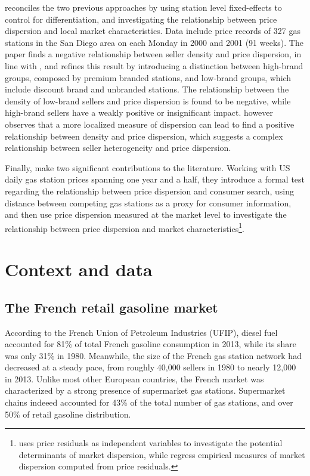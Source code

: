 \documentclass[english]{article}
\begin{document}
\cite{LEW08} reconciles the two previous approaches by using station level fixed-effects to control for differentiation, and investigating the relationship between price dispersion and local market characteristics. Data include price records of 327 gas stations in the San Diego area on each Monday in 2000 and 2001 (91 weeks). The paper finds a negative relationship between seller density and price dispersion, in line with \cite{BAR04}, and refines this result by introducing a distinction between high-brand groups, composed by premium branded stations, and low-brand groups, which include discount brand and unbranded stations. The relationship between the density of low-brand sellers and price dispersion is found to be negative, while high-brand sellers have a weakly positive or insignificant impact. \cite{LEW08} however observes that a more localized measure of dispersion can lead to find a positive relationship between density and price dispersion, which suggests a complex relationship between seller heterogeneity and price dispersion.

Finally, \cite{CHA11} make two significant contributions to the literature. Working with US daily gas station prices spanning one year and a half, they introduce a formal test regarding the relationship between price dispersion and consumer search, using distance between competing gas stations as a proxy for consumer information, and then use price dispersion measured at the market level to investigate the relationship between price dispersion and market characteristics\footnote{\cite{LEW08} uses price residuals as independent variables to investigate the potential determinants of market dispersion, while \cite{CHA11} regress empirical measures of market dispersion computed from price residuals.}.

\section{Context and data}

\subsection{The French retail gasoline market}

According to the French Union of Petroleum Industries (UFIP), diesel fuel accounted for 81\% of total French gasoline consumption in 2013, while its share was only 31\% in 1980. Meanwhile, the size of the French gas station network had decreased at a steady pace, from roughly 40,000 sellers in 1980 to nearly 12,000 in 2013. Unlike most other European countries, the French market was characterized by a strong presence of supermarket gas stations. Supermarket chains indeeed accounted for 43\% of the total number of gas stations, and over 50\% of retail gasoline distribution.
\end{document}

